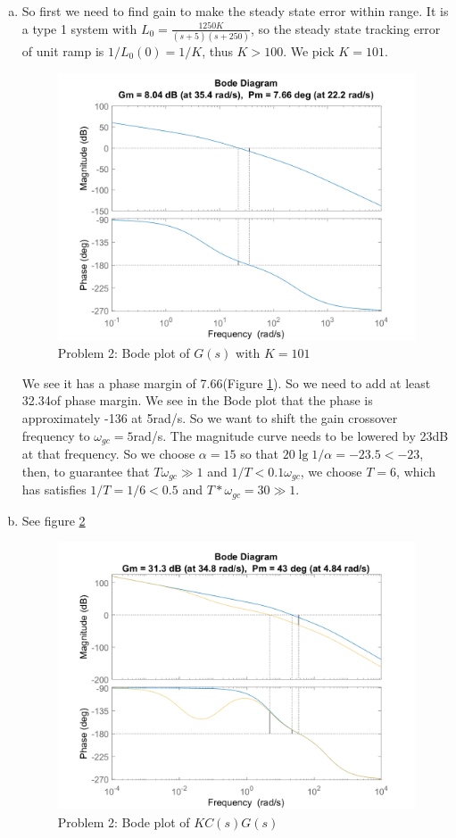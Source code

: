 \documentclass[11pt]{article}
\begin{document}
\begin{enumerate}[a)]
    \item So first we need to find gain to make the steady state error within range.
    It is a type 1 system with $L_0 = \frac{1250 K}{(s + 5)(s + 250)}$, so the steady state
    tracking error of unit ramp is $1/L_0(0) = 1/K$, thus $K > 100$.
    We pick $K = 101$.

    \begin{figure}[h!]
        \centering
        \includegraphics[width=0.55 \linewidth]{p2_bode_1.png}
        \caption{Problem 2: Bode plot of $G(s)$ with $K=101$}
        \label{fig:p2_bode_1}
    \end{figure}
    
    We see it has a phase margin of 7.66\degree (Figure \ref{fig:p2_bode_1}). So we need to add at least 32.34\degree of phase margin.
    We see in the Bode plot that the phase is approximately -136 at 5rad/s.
    So we want to shift the gain crossover frequency to $\omega_{gc} = 5$rad/s.
    The magnitude curve needs to be lowered by 23dB at that frequency.
    So we choose $\alpha = 15$ so that $20 \lg 1/\alpha = -23.5 < -23$,
    then, to guarantee that $T \omega_{gc} \gg 1$ and $1/T < 0.1 \omega_{gc}$,
    we choose $T = 6$, which has satisfies $1/T = 1/6 < 0.5$ and $T * \omega_{gc} = 30 \gg 1$.

    \item See figure \ref{fig:p2_bode_2} 
    \begin{figure}[h!]
        \centering
        \includegraphics[width=0.75 \linewidth]{p2_bode_2.png}
        \caption{Problem 2: Bode plot of $KC(s)G(s)$}
        \label{fig:p2_bode_2}
    \end{figure}
    
\end{enumerate}
\end{document}
